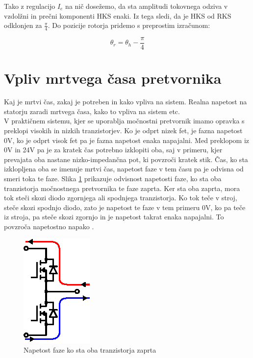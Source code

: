 \documentclass[a4paper,twoside,openright,12pt,slovene]{book}
\begin{document}
Tako z regulacijo $\hat{I}_{e}$ na nič dosežemo, da sta amplitudi tokovnega odziva v vzdolžni in prečni komponenti HKS enaki. Iz tega sledi, da je HKS od RKS odklonjen za $\frac{\pi}{4}$. Do pozicije
rotorja pridemo s preprostim izračunom:

\begin{equation}
    \theta_{r} = \theta_{h} - \frac{\pi}{4}
\end{equation}

\section{Vpliv mrtvega časa pretvornika}
Kaj je mrtvi čas, zakaj je potreben in kako vpliva na sistem. Realna napetost na statorju zaradi mrtvega časa, kako to vpliva na sistem etc. 
\\
V praktičnem sistemu, kjer se uporablja močnostni pretvornik imamo opravka s preklopi visokih in nizkih tranzistorjev. Ko je odprt nizek fet, je fazna napetost 0V, ko je odprt visok fet pa je fazna
napetost enaka napajalni. Med preklopom iz 0V in 24V pa je za kratek čas potrebno izklopiti oba, saj v primeru, kjer prevajata oba nastane nizko-impedančna pot, ki povzroči kratek stik. Čas, ko sta
izklopljena oba se imenuje mrtvi čas, napetost faze v tem času pa je odvisna od smeri toka te faze. Slika \ref{mrtviCasRazlaga} prikazuje odvisnost napetosti faze, ko sta oba tranzistorja močnostnega
pretvornika te faze zaprta. Ker sta oba zaprta, mora tok steči skozi diodo zgornjega ali spodnjega tranzistorja. Ko tok teče v stroj, steče skozi spodnjo diodo, zato je napetost te faze v tem primeru
0V, ko pa teče iz stroja, pa steče skozi zgornjo in je napetost takrat enaka napajalni. To povzroča napetostno napako \cite{ambrovzivc2016elektrivcni}.

\begin{figure}[!htbp]
    \centering
    \includegraphics[width=0.5\columnwidth]{Slike/Inkscape/mrtviCasRazlaga.eps}
    \caption{\label{mrtviCasRazlaga} Napetost faze ko sta oba tranzistorja zaprta}
\end{figure}
\end{document}
